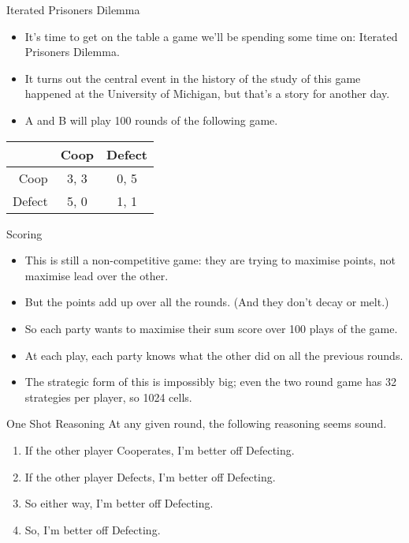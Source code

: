 \documentclass[
  ignorenonframetext,
]{beamer}
\providecommand{\tightlist}{%
  \setlength{\itemsep}{0pt}\setlength{\parskip}{0pt}}
\begin{document}
\begin{frame}{Iterated Prisoners Dilemma}
\protect\hypertarget{iterated-prisoners-dilemma}{}
\begin{itemize}
\tightlist
\item
  It's time to get on the table a game we'll be spending some time on:
  Iterated Prisoners Dilemma.
\item
  It turns out the central event in the history of the study of this
  game happened at the University of Michigan, but that's a story for
  another day.
\item
  A and B will play 100 rounds of the following game.
\end{itemize}

\begin{table}[!h]
\centering
\begin{tabular}[t]{>{}r|cc}
\toprule
 & Coop & Defect\\
\midrule
Coop & 3, 3 & 0, 5\\
Defect & 5, 0 & 1, 1\\
\bottomrule
\end{tabular}
\end{table}
\end{frame}

\begin{frame}{Scoring}
\protect\hypertarget{scoring}{}
\begin{itemize}
\tightlist
\item
  This is still a non-competitive game: they are trying to maximise
  points, not maximise lead over the other.
\item
  But the points add up over all the rounds. (And they don't decay or
  melt.)
\item
  So each party wants to maximise their sum score over 100 plays of the
  game.
\item
  At each play, each party knows what the other did on all the previous
  rounds.
\item
  The strategic form of this is impossibly big; even the two round game
  has 32 strategies per player, so 1024 cells.
\end{itemize}
\end{frame}

\begin{frame}{One Shot Reasoning}
\protect\hypertarget{one-shot-reasoning}{}
At any given round, the following reasoning seems sound.

\begin{enumerate}
\tightlist
\item
  If the other player Cooperates, I'm better off Defecting.
\item
  If the other player Defects, I'm better off Defecting.
\item
  So either way, I'm better off Defecting.
\item
  So, I'm better off Defecting.
\end{enumerate}
\end{frame}
\end{document}
